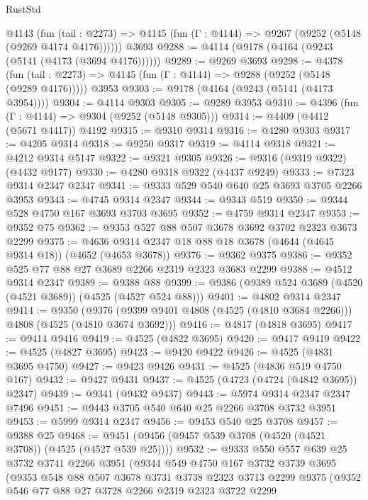 \begin{lexlean}{RustStd}
\begin{coremodule}
    @4143
      (fun (tail : @2273) => @4145 (fun (Γ : @4144) => @9267 (@9252 (@5148 (@9269 @4174 @4176))))))
    @3693
@9288 := @4114 (@9178 (@4164 (@9243 (@5141 (@4173 (@3694 @4176))))))
@9289 := @9269 @3693
@9298 := @4378
    (fun (tail : @2273) => @4145 (fun (Γ : @4144) => @9288 (@9252 (@5148 (@9289 @4176)))))
    @3953
@9303 := @9178 (@4164 (@9243 (@5141 (@4173 @3954))))
@9304 := @4114 @9303
@9305 := @9289 @3953
@9310 := @4396 (fun (Γ : @4144) => @9304 (@9252 (@5148 @9305)))
@9314 := @4409 (@4412 (@5671 @4417)) @4192
@9315 := @9310 @9314
@9316 := @4280 @9303
@9317 := @4205 @9314
@9318 := @9250 @9317
@9319 := @4114 @9318
@9321 := @4212 @9314 @5147
@9322 := @9321 @9305
@9326 := @9316 (@9319 @9322) (@4432 @9177)
@9330 := @4280 @9318 @9322 (@4437 @9249)
@9333 := @7323 @9314 @2347 @2347
@9341 := @9333 @529 @540 @640 @25 @3693 @3705 @2266 @3953
@9343 := @4745 @9314 @2347
@9344 := @9343 @519
@9350 := @9344 @528 @4750 @167 @3693 @3703 @3695
@9352 := @4759 @9314 @2347
@9353 := @9352 @75
@9362 := @9353 @527 @88 @507 @3678 @3692 @3702 @2323 @3673 @2299
@9375 := @4636 @9314 @2347 @18 @88 @18 @3678 (@4644 (@4645 @9314 @18)) (@4652 (@4653 @3678))
@9376 := @9362 @9375
@9386 := @9352 @525 @77 @88 @27 @3689 @2266 @2319 @2323 @3683 @2299
@9388 := @4512 @9314 @2347
@9389 := @9388 @88
@9399 := @9386 (@9389 @524 @3689 (@4520 (@4521 @3689)) (@4525 (@4527 @524 @88)))
@9401 := @4802 @9314 @2347
@9414 := @9350
    (@9376 (@9399 @9401 @4808 (@4525 (@4810 @3684 @2266))) @4808 (@4525 (@4810 @3674 @3692)))
@9416 := @4817 (@4818 @3695)
@9417 := @9414 @9416
@9419 := @4525 (@4822 @3695)
@9420 := @9417 @9419
@9422 := @4525 (@4827 @3695)
@9423 := @9420 @9422
@9426 := @4525 (@4831 @3695 @4750)
@9427 := @9423 @9426
@9431 := @4525 (@4836 @519 @4750 @167)
@9432 := @9427 @9431
@9437 := @4525 (@4723 (@4724 (@4842 @3695)) @2347)
@9439 := @9341 (@9432 @9437)
@9443 := @5974 @9314 @2347 @2347 @7496
@9451 := @9443 @3705 @540 @640 @25 @2266 @3708 @3732 @3951
@9453 := @5999 @9314 @2347
@9456 := @9453 @540 @25 @3708
@9457 := @9388 @25
@9468 := @9451 (@9456 (@9457 @539 @3708 (@4520 (@4521 @3708)) (@4525 (@4527 @539 @25))))
@9532 := @9333
    @550
    @557
    @639
    @25
    @3732
    @3741
    @2266
    @3951
    (@9344
      @549
      @4750
      @167
      @3732
      @3739
      @3695
      (@9353
        @548
        @88
        @507
        @3678
        @3731
        @3738
        @2323
        @3713
        @2299
        @9375
        (@9352
          @546
          @77
          @88
          @27
          @3728
          @2266
          @2319
          @2323
          @3722
          @2299

\end{coremodule}
\end{lexlean}
